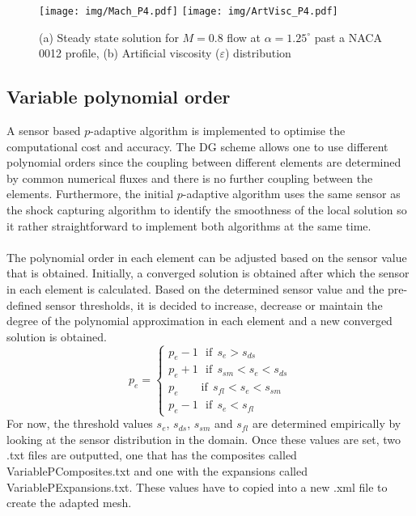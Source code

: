 \begin{figure}[!htbp]
\begin{center}
\texttt{[image: img/Mach\_P4.pdf]}
\texttt{[image: img/ArtVisc\_P4.pdf]}
\caption{(a) Steady state solution for $M=0.8$ flow at $\alpha = 1.25^\circ$ 
past a NACA 0012 profile, (b) Artificial viscosity ($\varepsilon$) distribution}
\label{fig:}
\end{center}
\end{figure}

\subsection{Variable polynomial order}
A sensor based $p$-adaptive algorithm is implemented to optimise the computational cost and accuracy.
The DG scheme allows one to use different polynomial orders since the coupling between different elements are determined by common numerical fluxes and there is no further 
coupling between the elements. Furthermore, the initial $p$-adaptive algorithm 
uses the same sensor as the shock capturing algorithm to identify the smoothness 
of the local solution so it rather straightforward to implement both algorithms 
at the same time.\\
\\
The polynomial order in each element can be adjusted based on the sensor value 
that is obtained. Initially, a converged solution is obtained after which the sensor 
in each element is calculated. Based on the determined sensor value and the 
pre-defined sensor thresholds, it is decided to increase, decrease or maintain 
the degree of the polynomial approximation in each element and a new converged 
solution is obtained.\\
\begin{equation}\label{eq:pswitch}
  p_e =\left \{ \begin{array}{l}
    p_e-1\	\	\ \mbox{if}\		\	 s_e>s_{ds}\\
    p_e+1\	\	\ \mbox{if}\		\	 s_{sm }<s_e<s_{ds}\\
    p_e\	\	\	\	\	\	\	\	\	 \mbox{if}\		\ s_{fl}<s_e<s_{sm}\\
    p_e-1\	\	\ \mbox{if}\		\	 s_e<s_{fl}
    \end{array}
    \right.
\end{equation}
For now, the threshold values $s_e$, $s_{ds}$, $s_{sm}$ and $s_{fl}$ are determined 
empirically by looking at the sensor distribution in the domain. Once these values 
are set, two .txt files are outputted, one that has the composites called VariablePComposites.txt 
and one with the expansions called VariablePExpansions.txt. These values have 
to copied into a new .xml file to create the adapted mesh.
